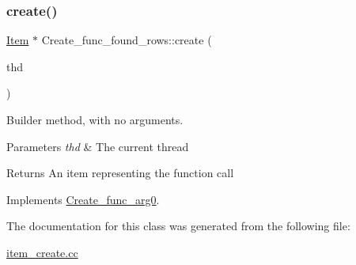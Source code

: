 \subsubsection{\texorpdfstring{create()}{create()}}
{\footnotesize\ttfamily \mbox{\hyperlink{classItem}{Item}} $\ast$ Create\+\_\+func\+\_\+found\+\_\+rows\+::create (\begin{DoxyParamCaption}\item[{T\+HD $\ast$}]{thd }\end{DoxyParamCaption})\hspace{0.3cm}{\ttfamily [virtual]}}

Builder method, with no arguments. 
\begin{DoxyParams}{Parameters}
{\em thd} & The current thread \\
\hline
\end{DoxyParams}
\begin{DoxyReturn}{Returns}
An item representing the function call 
\end{DoxyReturn}


Implements \mbox{\hyperlink{classCreate__func__arg0_abb65b43817f9382759c79487228ee29f}{Create\+\_\+func\+\_\+arg0}}.



The documentation for this class was generated from the following file\+:\begin{DoxyCompactItemize}
\item 
\mbox{\hyperlink{item__create_8cc}{item\+\_\+create.\+cc}}\end{DoxyCompactItemize}
